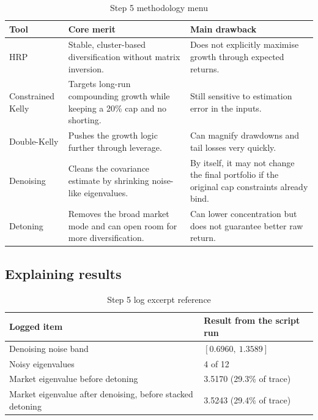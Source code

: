 \documentclass[11pt,a4paper]{article}
\begin{document}
\begin{table}[H]
\centering
\caption{Step 5 methodology menu}
\label{tab:step5_methods}
{\small\setlength{\tabcolsep}{4pt}\renewcommand{\arraystretch}{1.15}\begin{tabularx}{\textwidth}{>{\raggedright\arraybackslash}p{3.2cm} >{\raggedright\arraybackslash}p{3.9cm} X}
\toprule
Tool & Core merit & Main drawback \\
\midrule
HRP & Stable, cluster-based diversification without matrix inversion. & Does not explicitly maximise growth through expected returns. \\
Constrained Kelly & Targets long-run compounding growth while keeping a 20\% cap and no shorting. & Still sensitive to estimation error in the inputs. \\
Double-Kelly & Pushes the growth logic further through leverage. & Can magnify drawdowns and tail losses very quickly. \\
Denoising & Cleans the covariance estimate by shrinking noise-like eigenvalues. & By itself, it may not change the final portfolio if the original cap constraints already bind. \\
Detoning & Removes the broad market mode and can open room for more diversification. & Can lower concentration but does not guarantee better raw return. \\
\bottomrule
\end{tabularx}}
\end{table}

\subsection{Explaining results}

\begin{table}[H]
\centering
\caption{Step 5 log excerpt reference}
\label{tab:step5_logs_ref}
{\small\setlength{\tabcolsep}{4pt}\renewcommand{\arraystretch}{1.15}\begin{tabularx}{\textwidth}{>{\raggedright\arraybackslash}p{4.0cm} X}
\toprule
Logged item & Result from the script run \\
\midrule
Denoising noise band & \([0.6960,\ 1.3589]\) \\
Noisy eigenvalues & 4 of 12 \\
Market eigenvalue before detoning & 3.5170 (29.3\% of trace) \\
Market eigenvalue after denoising, before stacked detoning & 3.5243 (29.4\% of trace) \\
\bottomrule
\end{tabularx}}
\end{table}
\end{document}
